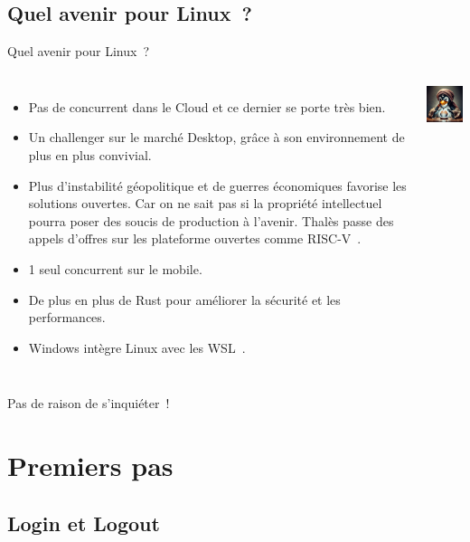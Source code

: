 \documentclass{beamer}
\begin{document}
    \subsection{Quel avenir pour Linux~?}\label{subsec:future-of-linux}

    \begin{frame}{Quel avenir pour Linux~?}
        \begin{columns}
            \begin{itemize}
                \item Pas de concurrent dans le Cloud et ce dernier se porte très bien.
                \item Un challenger sur le marché Desktop, grâce à son environnement de plus en plus convivial.
                \item Plus d'instabilité géopolitique et de guerres économiques favorise les solutions ouvertes.
                Car on ne sait pas si la propriété intellectuel pourra poser des soucis de production à l'avenir.
                Thalès passe des appels d'offres sur les plateforme ouvertes comme RISC-V~.
                \item 1 seul concurrent sur le mobile.
                \item De plus en plus de Rust pour améliorer la sécurité et les performances.
                \item Windows intègre Linux avec les WSL~.
            \end{itemize}
            \centering
            \includegraphics[width=4cm]{image/pinguin-fortune-teller}
        \end{columns}
        \bigbreak
        Pas de raison de s'inquiéter~!
    \end{frame}


    \section{Premiers pas}\label{sec:first-step}

    \subsection{Login et Logout}\label{subsec:login-logout}
\end{document}
